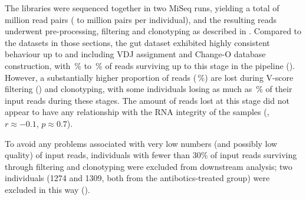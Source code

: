 The libraries were sequenced together in two MiSeq runs, yielding a total of  million read pairs ( to  million pairs per individual), and the resulting reads underwent pre-processing, filtering and clonotyping as described in . Compared to the datasets in those sections, the gut dataset exhibited highly consistent behaviour up to and including VDJ assignment and Change-O database construction, with \,\% to \,\% of reads surviving up to this stage in the pipeline (). However, a substantially higher proportion of reads (\,\%) are lost during V-score filtering () and clonotyping, with some individuals losing as much as \,\% of their input reads during these stages. The amount of reads lost at this stage did not appear to have any relationship with the RNA integrity of the samples (, $r \approx -0.1$, $p \approx 0.7$).

To avoid any problems associated with very low numbers (and possibly low quality) of input reads, individuals with fewer than 30\% of input reads surviving through filtering and clonotyping were excluded from downstream analysis; two individuals (1274 and 1309, both from the antibotics-treated group) were excluded in this way ().

